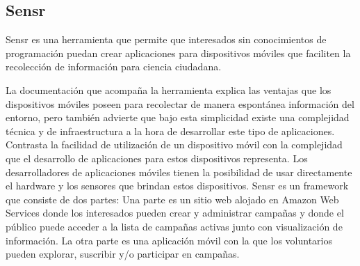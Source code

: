 \subsection{Sensr}


Sensr \cite{kim2013sensr} es una herramienta que permite que interesados sin conocimientos de programación
puedan crear aplicaciones para dispositivos móviles que faciliten la recolección de información para ciencia ciudadana. 

La documentación que acompaña la herramienta explica las ventajas que los dispositivos móviles poseen para recolectar de manera espontánea información del entorno, pero también advierte que bajo esta simplicidad existe una complejidad técnica y de infraestructura a la hora de desarrollar este tipo de aplicaciones. Contrasta la facilidad de utilización de un dispositivo móvil con la complejidad que el desarrollo de aplicaciones para estos dispositivos representa. Los desarrolladores de aplicaciones móviles tienen la posibilidad de usar directamente el hardware y los sensores que brindan estos dispositivos. 
Sensr es un framework que consiste de dos partes:
Una parte es un sitio web alojado en Amazon Web Services donde los interesados pueden crear y administrar campañas y donde el público puede acceder a la lista de campañas activas junto con visualización de información. La otra parte es una aplicación móvil con la que los voluntarios pueden explorar, suscribir y/o participar en campañas.


